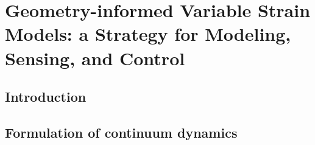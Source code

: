 \graphicspath{{3_chapters/4_chapter/img/}}
\chapter[Harmonizing FEM and beam models]{Geometry-informed Variable Strain Models: a Strategy for Modeling, Sensing, and Control}
\label{chap: chapter 4}




\section{Introduction} \label{sec:chap1_introduction}


\section{Formulation of continuum dynamics} \label{sec:chap1_introduction}


